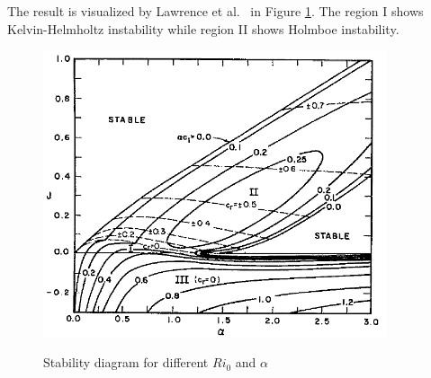 The result is visualized by Lawrence et al.~\cite{Lawrence} in
Figure \ref{ho3}. The region I shows Kelvin-Helmholtz instability
while region II shows Holmboe instability.
\begin{figure}[htpb]
  \centering
  \includegraphics[width=0.9\textwidth]{ho3.png}\\
  \caption{Stability diagram for different $Ri_0$ and $\alpha$}\label{ho3}
\end{figure}
